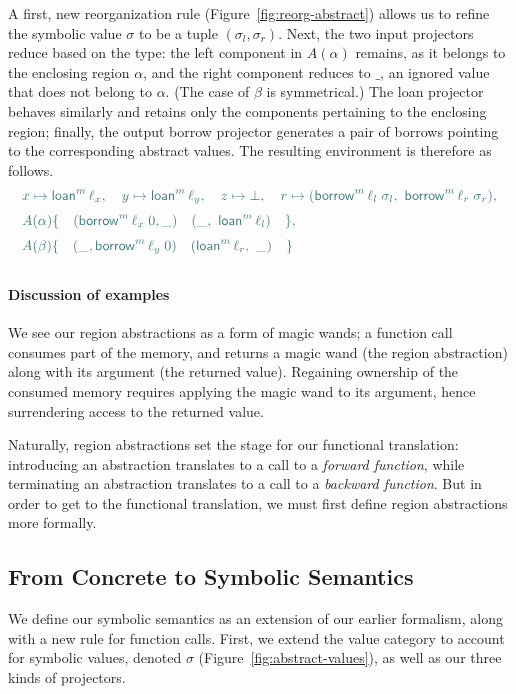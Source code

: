 \documentclass[acmsmall,screen]{acmart}
\newcommand{\fref}[1]{Figure~\ref{fig:#1}}
\newcommand\emborrow[2]{\ensuremath{\mathsf{borrow}^m\,#1\;#2}}
\newcommand\emloan[1]{\ensuremath{\mathsf{loan}^m\,#1}}
\newcommand\myparagraph[1]{\emph{#1}.\ }
\let\myparagraph\paragraph
\begin{document}
A first, new reorganization rule (\fref{reorg-abstract})
allows us to refine the symbolic value $\sigma$ to be a tuple
$(\sigma_l, \sigma_r)$. Next, the two input projectors reduce based on the type: the left
component in $A(\alpha)$ remains, as it belongs to the enclosing region
$\alpha$, and the right component reduces to $\_$, an ignored value that does
not belong to $\alpha$. (The case of $\beta$ is symmetrical.)
The loan
projector behaves similarly and retains only the components pertaining to the
enclosing region; finally, the output borrow projector generates a pair of
borrows pointing to the corresponding abstract values. The resulting environment
is therefore as follows.
\small
\[
\color{envcolor}
\begin{array}{l}
  x \mapsto \emloan\ell_x,\quad y \mapsto \emloan\ell_y,\quad z \mapsto \bot,\quad
  r \mapsto (\emborrow{\ell_l}{\sigma_l},\ \emborrow{\ell_r}{\sigma_r}), \\[\medskipamount]
  A(\alpha) \{
    \quad (\emborrow{\ell_x}0, \_)
    \quad (\_,\ \emloan\ell_l)
  \quad \}, \\[\medskipamount]
  A(\beta) \{
  \quad (\_, \emborrow{\ell_y}0)
  \quad (\emloan\ell_r,\ \_)
  \quad \}\\[\medskipamount]
\end{array}
\]
\normalsize
\myparagraph{Discussion of examples}
We see our region abstractions as a form of magic wands; a function call consumes part
of the memory, and returns a magic wand (the region abstraction) along with its
argument (the returned value). Regaining ownership of the consumed memory
requires applying the magic wand to its argument, hence surrendering access to
the returned value.

Naturally, region abstractions set the stage for our functional translation:
introducing an abstraction translates to a call to a \emph{forward function},
while terminating an abstraction translates to a call to a \emph{backward
function}. But in order to get to the functional translation, we must first
define region abstractions more formally.

\subsection{From Concrete to Symbolic Semantics}
\label{sec:concrete-to-symbolic}

We define our symbolic semantics as an extension of our earlier formalism, along
with a new rule for function calls. First, we extend the value category to
account for symbolic values, denoted $\sigma$ (\fref{abstract-values}), as well as our three kinds
of projectors.
\end{document}
